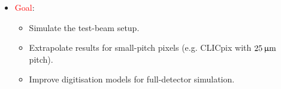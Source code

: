 \begin{frame}
\begin{columns}
    \centering
  \end{columns}

  \begin{itemize}
  \item \textcolor{Red}{Goal}:
    \begin{itemize}
    \item Simulate the test-beam setup.
    \item Extrapolate results for small-pitch pixels (e.g.  CLICpix
      with $25\,\upmu\mathrm{m}$ pitch).
    \item Improve digitisation models for full-detector simulation.
    \end{itemize}
  \end{itemize}

\end{frame}

